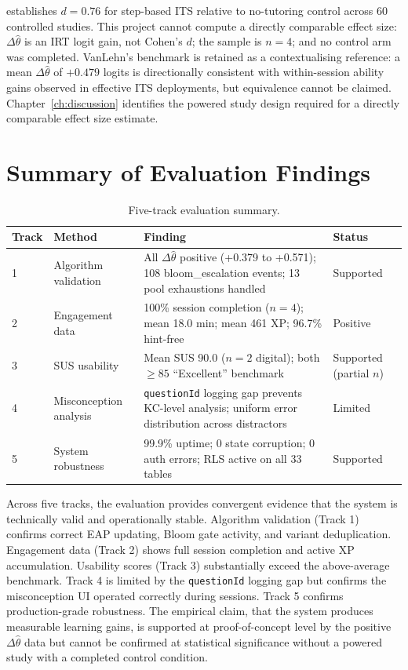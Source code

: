 \textcite{vanlehn2011} establishes $d = 0.76$ for step-based ITS relative to
no-tutoring control across 60 controlled studies. This project cannot compute
a directly comparable effect size: $\Delta\hat{\theta}$ is an IRT logit gain,
not Cohen's $d$; the sample is $n = 4$; and no control arm was completed.
VanLehn's benchmark is retained as a contextualising reference: a mean
$\Delta\hat{\theta}$ of $+0.479$ logits is directionally consistent with
within-session ability gains observed in effective ITS deployments, but
equivalence cannot be claimed. Chapter~\ref{ch:discussion} identifies the
powered study design required for a directly comparable effect size estimate.

\section{Summary of Evaluation Findings}
\label{sec:results_summary}

\begin{table}[H]
\centering
\caption{Five-track evaluation summary.}
\label{tab:eval_summary}
\renewcommand{\arraystretch}{1.25}
\begin{tabularx}{\textwidth}{llXl}
\toprule
\textbf{Track} & \textbf{Method} & \textbf{Finding} & \textbf{Status} \\
\midrule
1 & Algorithm validation &
  All $\Delta\hat{\theta}$ positive (+0.379 to +0.571); 108 bloom\_escalation events; 13 pool exhaustions handled &
  Supported \\
2 & Engagement data &
  100\% session completion ($n=4$); mean 18.0 min; mean 461 XP; 96.7\% hint-free &
  Positive \\
3 & SUS usability &
  Mean SUS 90.0 ($n=2$ digital); both $\geq 85$ ``Excellent'' benchmark &
  Supported (partial $n$) \\
4 & Misconception analysis &
  \texttt{questionId} logging gap prevents KC-level analysis; uniform error distribution across distractors &
  Limited \\
5 & System robustness &
  99.9\% uptime; 0 state corruption; 0 auth errors; RLS active on all 33 tables &
  Supported \\
\bottomrule
\end{tabularx}
\end{table}

Across five tracks, the evaluation provides convergent evidence that the
system is technically valid and operationally stable. Algorithm validation
(Track 1) confirms correct EAP updating, Bloom gate activity, and variant
deduplication. Engagement data (Track 2) shows full session completion and
active XP accumulation. Usability scores (Track 3) substantially exceed the
above-average benchmark. Track 4 is limited by the \texttt{questionId}
logging gap but confirms the misconception UI operated correctly during
sessions. Track 5 confirms production-grade robustness. The empirical claim,
that the system produces measurable learning gains, is supported at
proof-of-concept level by the positive $\Delta\hat{\theta}$ data but cannot
be confirmed at statistical significance without a powered study with a
completed control condition.
